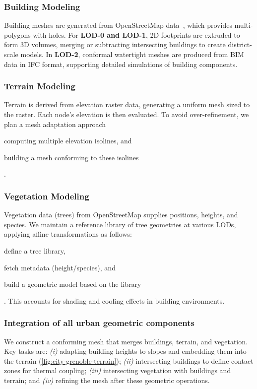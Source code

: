 \documentclass[runningheads]{llncs}
\begin{document}
\subsubsection{Building Modeling}

Building meshes are generated from OpenStreetMap data~\cite{openstreetmap_contributors_planet_2017}, which provides multi-polygons with holes. For \textbf{LOD-0 and LOD-1}, 2D footprints are extruded to form 3D volumes, merging or subtracting intersecting buildings to create district-scale models. In \textbf{LOD-2}, conformal watertight meshes are produced from BIM data in IFC format, supporting detailed simulations of building components.

\subsubsection{Terrain Modeling}
Terrain is derived from elevation raster data, generating a uniform mesh sized to the raster. Each node's elevation is then evaluated. To avoid over-refinement, we plan a mesh adaptation approach \begin{inparaenum}[\it (i)]\item computing multiple elevation isolines, and \item building a mesh conforming to these isolines\end{inparaenum}.

\subsubsection{Vegetation Modeling}
Vegetation data (trees) from OpenStreetMap supplies positions, heights, and species. We maintain a reference library of tree geometries at various LODs, applying affine transformations as follows: \begin{inparaenum}[\it (i)]\item define a tree library, \item fetch metadata (height/species), and \item build a geometric model based on the library\end{inparaenum}. This accounts for shading and cooling effects in building environments.

\subsubsection{Integration of all urban geometric components}

We construct a conforming mesh that merges buildings, terrain, and vegetation. Key tasks are: \textit{(i)} adapting building heights to slopes and embedding them into the terrain (\cref{fig:city-grenoble-terrain}); \textit{(ii)} intersecting buildings to define contact zones for thermal coupling; \textit{(iii)} intersecting vegetation with buildings and terrain; and \textit{(iv)} refining the mesh after these geometric operations.
\end{document}
